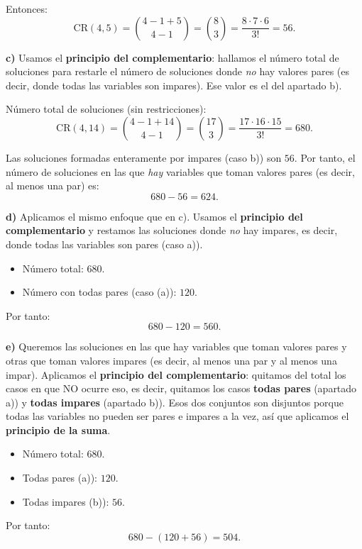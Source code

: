 \documentclass[a4paper,12pt]{article}
\begin{document}
\begin{ejercicio}[title=Ejercicio 34]
Entonces:
\[
\mathrm{CR}(4,5)=\binom{4-1+5}{4-1}=\binom{8}{3}=\frac{8\cdot7\cdot6}{3!}=\boxed{56}.
\]

\bigskip

\textbf{c)}  
Usamos el \textbf{principio del complementario}: hallamos el número total de soluciones para restarle el número de soluciones donde \emph{no} hay valores pares (es decir, donde todas las variables son impares). Ese valor es el del apartado b).

Número total de soluciones (sin restricciones):
\[
\mathrm{CR}(4,14)=\binom{4-1+14}{4-1}=\binom{17}{3}=\frac{17\cdot16\cdot15}{3!}=680.
\]

Las soluciones formadas enteramente por impares (caso b)) son \(56\).  
Por tanto, el número de soluciones en las que \emph{hay} variables que toman valores pares (es decir, al menos una par) es:
\[
680 - 56 = \boxed{624}.
\]

\bigskip

\textbf{d)}  
Aplicamos el mismo enfoque que en c). Usamos el \textbf{principio del complementario} y restamos las soluciones donde \emph{no} hay impares, es decir, donde todas las variables son pares (caso a)).

\begin{itemize}
\item Número total: \(680\).  
\item Número con todas pares (caso (a)): \(120\).
\end{itemize}

Por tanto:
\[
680 - 120 = \boxed{560}.
\]

\bigskip

\textbf{e)}  
Queremos las soluciones en las que hay variables que toman valores pares y otras que toman valores impares (es decir, al menos una par y al menos una impar).  
Aplicamos el \textbf{principio del complementario}: quitamos del total los casos en que NO ocurre eso, es decir, quitamos los casos \textbf{todas pares} (apartado a)) y \textbf{todas impares} (apartado b)). Esos dos conjuntos son disjuntos porque todas las variables no pueden ser pares e impares a la vez, así que aplicamos el \textbf{principio de la suma}.

\begin{itemize}
\item Número total: \(680\).
\item Todas pares (a)): \(120\).  
\item Todas impares (b)): \(56\).
\end{itemize}

Por tanto:
\[
680 - (120 + 56) = \boxed{504}.
\]

\end{ejercicio}
\end{document}
